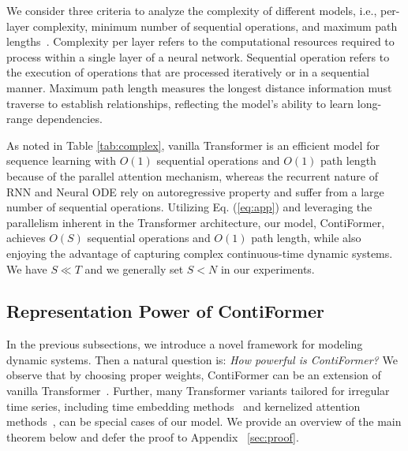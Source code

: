 \documentclass{article}
\begin{document}
We consider three criteria to analyze the complexity of different models, i.e., per-layer complexity, minimum number of sequential operations, and maximum path lengths~\cite{vaswani2017attention}. 
Complexity per layer refers to the computational resources required to process within a single layer of a neural network. 
Sequential operation refers to the execution of operations that are processed iteratively or in a sequential manner. 
Maximum path length measures the longest distance information must traverse to establish relationships, reflecting the model's ability to learn long-range dependencies.

As noted in Table \ref{tab:complex}, 
vanilla Transformer is an efficient model for sequence learning with $O(1)$ sequential operations and $O(1)$ path length because of the parallel attention mechanism, whereas the recurrent nature of RNN and Neural ODE rely on autoregressive property and suffer from a large number of sequential operations.
Utilizing Eq. (\ref{eq:app}) and leveraging the parallelism inherent in the Transformer architecture, our model, ContiFormer, achieves $O(S)$  sequential operations and $O(1)$ path length, while also enjoying the advantage of capturing complex continuous-time dynamic systems. We have $S \ll T$ and we generally set $S < N$ in our experiments.

\subsection{Representation Power of ContiFormer}

In the previous subsections, we introduce a novel framework for modeling dynamic systems. Then a natural question is: \textit{How powerful is ContiFormer?} 
We observe that by choosing proper weights, ContiFormer can be an extension of vanilla Transformer~\cite{vaswani2017attention}. 
Further, many Transformer variants tailored for irregular time series, including time embedding methods~\cite{xu2019self, shukla2021multi} and kernelized attention methods~\cite{ma2022non, li2020time}, can be special cases of our model. 
We provide an overview of the main theorem below and defer the proof to Appendix ~\ref{sec:proof}.
\end{document}
